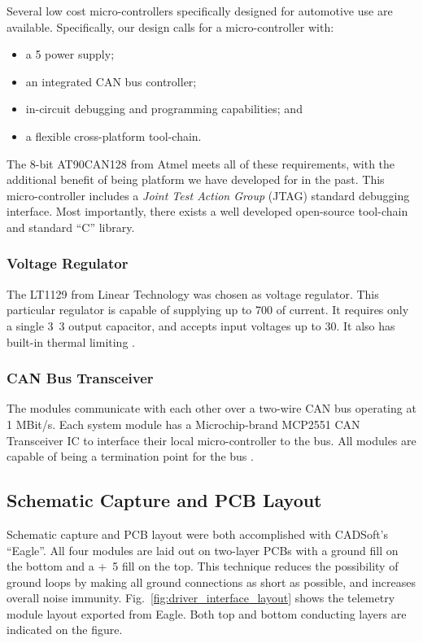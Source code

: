 Several low cost micro-controllers specifically designed for automotive use are available. Specifically, our design calls for a micro-controller with:

\begin{itemize}
  \item a \unit{5}{\volt} power supply;
  \item an integrated CAN bus controller;
  \item in-circuit debugging and programming capabilities; and
  \item a flexible cross-platform tool-chain.
\end{itemize}


The 8-bit AT90CAN128 from Atmel meets all of these requirements, with the additional benefit of being platform we have developed for in the past. This micro-controller includes a \emph{Joint Test Action Group} (JTAG) standard debugging interface. Most importantly, there exists a well developed open-source tool-chain and standard ``C'' library.

\subsubsection{Voltage Regulator}

The LT1129 from Linear Technology was chosen as voltage regulator. This particular regulator is capable of supplying up to \unit{700}{\milli\ampere} of current. It requires only a single \unit{3.3}{\micro\farad} output capacitor, and accepts input voltages up to \unit{30}{\volt}. It also has built-in thermal limiting \cite{LTC1129}.

\subsubsection{CAN Bus Transceiver}

The modules communicate with each other over a two-wire CAN bus operating at 1 MBit/s. Each system module has a Microchip-brand MCP2551 CAN Transceiver IC to interface their local micro-controller to the bus. All modules are capable of being a termination point for the bus \cite{MCP2551}. 

\subsection{Schematic Capture and PCB Layout}

Schematic capture and PCB layout were both accomplished with CADSoft's ``Eagle''. All four modules are laid out on two-layer PCBs with a ground fill on the bottom and a \unit{+5}{\volt} fill on the top. This technique reduces the possibility of ground loops by making all ground connections as short as possible, and increases overall noise immunity. Fig.\ \ref{fig:driver_interface_layout} shows the telemetry module layout exported from Eagle. Both top and bottom conducting layers are indicated on the figure.

